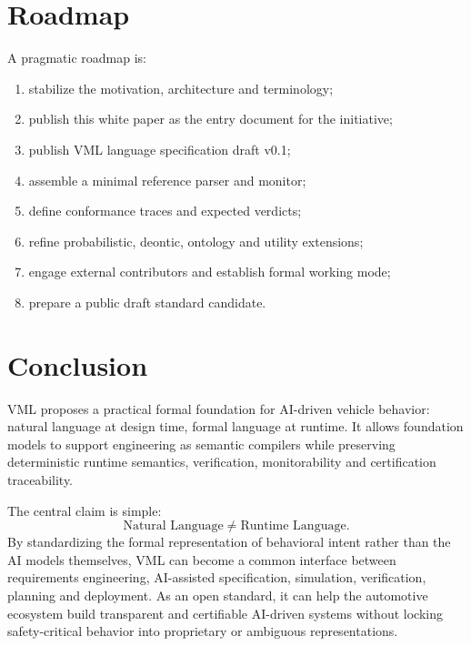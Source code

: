 \documentclass[11pt,a4paper]{article}
\newcommand{\VML}{\textsc{VML}}
\begin{document}
\section{Roadmap}
A pragmatic roadmap is:
\begin{enumerate}
  \item stabilize the motivation, architecture and terminology;
  \item publish this white paper as the entry document for the initiative;
  \item publish \VML{} language specification draft v0.1;
  \item assemble a minimal reference parser and monitor;
  \item define conformance traces and expected verdicts;
  \item refine probabilistic, deontic, ontology and utility extensions;
  \item engage external contributors and establish formal working mode;
  \item prepare a public draft standard candidate.
\end{enumerate}

\section{Conclusion}
\VML{} proposes a practical formal foundation for AI-driven vehicle behavior: natural language at design time, formal language at runtime. It allows foundation models to support engineering as semantic compilers while preserving deterministic runtime semantics, verification, monitorability and certification traceability.

The central claim is simple:
\[
  \text{Natural Language} \ne \text{Runtime Language}.
\]
By standardizing the formal representation of behavioral intent rather than the AI models themselves, \VML{} can become a common interface between requirements engineering, AI-assisted specification, simulation, verification, planning and deployment. As an open standard, it can help the automotive ecosystem build transparent and certifiable AI-driven systems without locking safety-critical behavior into proprietary or ambiguous representations.

\appendix
\end{document}

